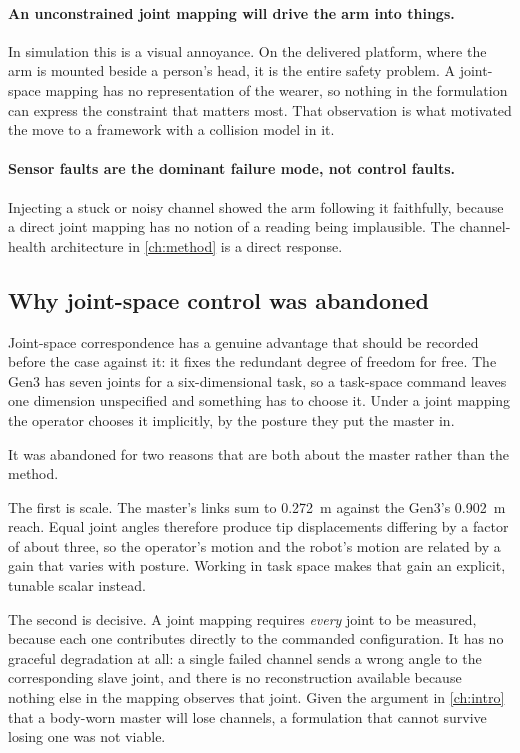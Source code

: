 \paragraph{An unconstrained joint mapping will drive the arm into things.}
In simulation this is a visual annoyance. On the delivered platform, where the
arm is mounted beside a person's head, it is the entire safety problem. A
joint-space mapping has no representation of the wearer, so nothing in the
formulation can express the constraint that matters most. That observation is
what motivated the move to a framework with a collision model in it.

\paragraph{Sensor faults are the dominant failure mode, not control faults.}
Injecting a stuck or noisy channel showed the arm following it faithfully,
because a direct joint mapping has no notion of a reading being implausible.
The channel-health architecture in \cref{ch:method} is a direct response.

\subsection{Why joint-space control was abandoned}

Joint-space correspondence has a genuine advantage that should be recorded
before the case against it: it fixes the redundant degree of freedom for free.
The Gen3 has seven joints for a six-dimensional task, so a task-space command
leaves one dimension unspecified and something has to choose it. Under a joint
mapping the operator chooses it implicitly, by the posture they put the master
in.

It was abandoned for two reasons that are both about the master rather than
the method.

The first is scale. The master's links sum to \SI{0.272}{\metre} against the
Gen3's \SI{0.902}{\metre} reach. Equal joint angles therefore produce tip
displacements differing by a factor of about three, so the operator's motion
and the robot's motion are related by a gain that varies with posture. Working
in task space makes that gain an explicit, tunable scalar instead.

The second is decisive. A joint mapping requires \emph{every} joint to be
measured, because each one contributes directly to the commanded
configuration. It has no graceful degradation at all: a single failed channel
sends a wrong angle to the corresponding slave joint, and there is no
reconstruction available because nothing else in the mapping observes that
joint. Given the argument in \cref{ch:intro} that a body-worn master will lose
channels, a formulation that cannot survive losing one was not viable.

